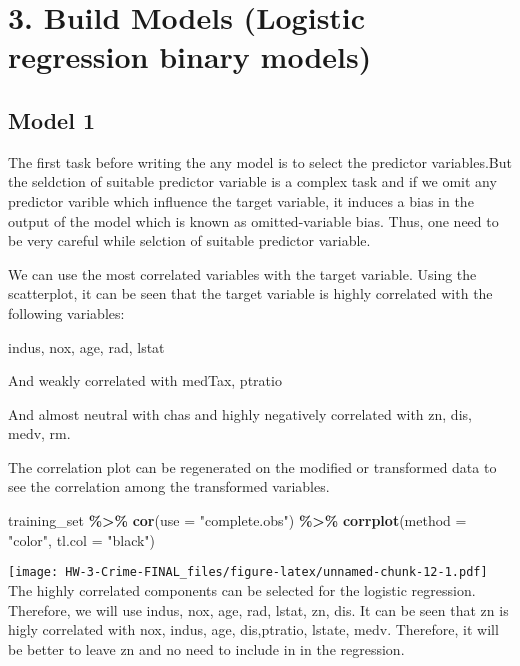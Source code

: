 \documentclass[
]{article}
\newenvironment{Shaded}{\begin{snugshade}}{\end{snugshade}}
\newcommand{\AttributeTok}[1]{\textcolor[rgb]{0.13,0.29,0.53}{#1}}
\newcommand{\FunctionTok}[1]{\textcolor[rgb]{0.13,0.29,0.53}{\textbf{#1}}}
\newcommand{\NormalTok}[1]{#1}
\newcommand{\SpecialCharTok}[1]{\textcolor[rgb]{0.81,0.36,0.00}{\textbf{#1}}}
\newcommand{\StringTok}[1]{\textcolor[rgb]{0.31,0.60,0.02}{#1}}
\begin{document}
\hypertarget{build-models-logistic-regression-binary-models}{%
\section{3. Build Models (Logistic regression binary
models)}\label{build-models-logistic-regression-binary-models}}

\hypertarget{model-1}{%
\subsection{Model 1}\label{model-1}}

The first task before writing the any model is to select the predictor
variables.But the seldction of suitable predictor variable is a complex
task and if we omit any predictor varible which influence the target
variable, it induces a bias in the output of the model which is known as
omitted-variable bias. Thus, one need to be very careful while selction
of suitable predictor variable.

We can use the most correlated variables with the target variable. Using
the scatterplot, it can be seen that the target variable is highly
correlated with the following variables:

indus, nox, age, rad, lstat

And weakly correlated with medTax, ptratio

And almost neutral with chas and highly negatively correlated with zn,
dis, medv, rm.

The correlation plot can be regenerated on the modified or transformed
data to see the correlation among the transformed variables.

\begin{Shaded}
\begin{Highlighting}[]
\NormalTok{training\_set }\SpecialCharTok{\%\textgreater{}\%} 
  \FunctionTok{cor}\NormalTok{(}\AttributeTok{use =} \StringTok{"complete.obs"}\NormalTok{) }\SpecialCharTok{\%\textgreater{}\%}
  \FunctionTok{corrplot}\NormalTok{(}\AttributeTok{method =} \StringTok{"color"}\NormalTok{, }\AttributeTok{tl.col =} \StringTok{"black"}\NormalTok{)}
\end{Highlighting}
\end{Shaded}

\texttt{[image: HW-3-Crime-FINAL\_files/figure-latex/unnamed-chunk-12-1.pdf]}
The highly correlated components can be selected for the logistic
regression. Therefore, we will use indus, nox, age, rad, lstat, zn, dis.
It can be seen that zn is higly correlated with nox, indus, age,
dis,ptratio, lstate, medv. Therefore, it will be better to leave zn and
no need to include in in the regression.
\end{document}
